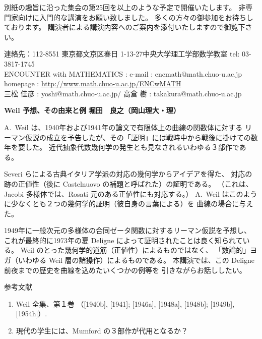 \documentclass[uplatex,dvipdfmx]{jlreq}
\begin{document}
\noindent
別紙の趣旨に沿った集会の第25回を以上のような予定で開催いたします。
非専門家向けに入門的な講演をお願い致しました。
多くの方々の御参加をお待ちしております。
講演者による講演内容へのご案内を添付いたしますので御覧下さい。

\vspace{5pt}

\noindent
連絡先：112-8551 東京都文京区春日 1-13-27\quad 中央大学理工学部数学教室\quad
tel: 03-3817-1745\\
ENCOUNTER with MATHEMATICS : e-mail : encmath@math.chuo-u.ac.jp\\
homepage : \url{http://www.math.chuo-u.ac.jp/ENCwMATH}\\
三松 佳彦 : yoshi@math.chuo-u.ac.jp\quad /\quad
高倉 樹 : takakura@math.chuo-u.ac.jp

\vfill

\newpage

\noindent
{\large\bfseries Weil 予想、その由来と例}
\hfill
{\large\bfseries 堀田　良之（岡山理大・理）}

\bigskip

A.~Weil は、1940年および1941年の論文で有限体上の曲線の関数体に対する
リーマン仮説の成立を予告したが、その「証明」には戦時中から戦後に掛けての数年を要した。
近代抽象代数幾何学の発生とも見なされるいわゆる３部作である。

Severi らによる古典イタリア学派の対応の幾何学からアイデアを得た、
対応の跡の正値性（後に Castelnuovo の補題と呼ばれた）の証明である。
（これは、Jacobi 多様体では、Rosati 元のある正値性にも対応する。）
A.~Weil はこのように少なくとも２つの幾何学的証明（彼自身の言葉による）を
曲線の場合に与えた。

1949年に一般次元の多様体の合同ゼータ関数に対するリーマン仮説を予想し、
これが最終的に1973年の夏 Deligne によって証明されたことは良く知られている。
Weil のとった幾何学的道筋（正値性）によるものではなく、
「数論的」ヨガ（いわゆる Weil 層の諸操作）によるものである。
本講演では、この Deligne 前夜までの歴史を曲線を込めたいくつかの例等を
引きながらお話ししたい。

\vspace{6pt}

\begin{center}
  \textsc{参考文献}
\end{center}
\begin{enumerate}
  \item[{[1]}] Weil 全集、第１巻
        （[1940b], [1941]; [1946a], [1948a], [1948b]; [1949b], [1954h]）.
  \item[{[2]}] 現代の学生には、Mumford の３部作が代用となるか？
\end{enumerate}
\end{document}
